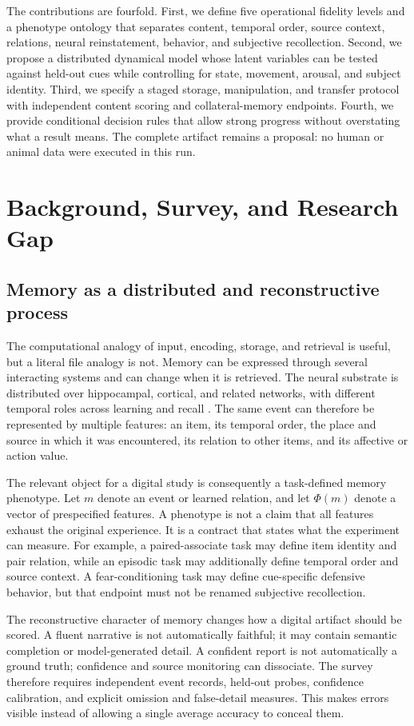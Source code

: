 \documentclass[conference]{IEEEtran}
\begin{document}
The contributions are fourfold. First, we define five operational fidelity levels and a phenotype ontology that separates content, temporal order, source context, relations, neural reinstatement, behavior, and subjective recollection. Second, we propose a distributed dynamical model whose latent variables can be tested against held-out cues while controlling for state, movement, arousal, and subject identity. Third, we specify a staged storage, manipulation, and transfer protocol with independent content scoring and collateral-memory endpoints. Fourth, we provide conditional decision rules that allow strong progress without overstating what a result means. The complete artifact remains a proposal: no human or animal data were executed in this run.

\section{Background, Survey, and Research Gap}
\subsection{Memory as a distributed and reconstructive process}
The computational analogy of input, encoding, storage, and retrieval is useful, but a literal file analogy is not. Memory can be expressed through several interacting systems and can change when it is retrieved. The neural substrate is distributed over hippocampal, cortical, and related networks, with different temporal roles across learning and recall \cite{Squire2011,Kandel2014}. The same event can therefore be represented by multiple features: an item, its temporal order, the place and source in which it was encountered, its relation to other items, and its affective or action value.

The relevant object for a digital study is consequently a task-defined memory phenotype. Let $m$ denote an event or learned relation, and let $\Phi(m)$ denote a vector of prespecified features. A phenotype is not a claim that all features exhaust the original experience. It is a contract that states what the experiment can measure. For example, a paired-associate task may define item identity and pair relation, while an episodic task may additionally define temporal order and source context. A fear-conditioning task may define cue-specific defensive behavior, but that endpoint must not be renamed subjective recollection.

The reconstructive character of memory changes how a digital artifact should be scored. A fluent narrative is not automatically faithful; it may contain semantic completion or model-generated detail. A confident report is not automatically a ground truth; confidence and source monitoring can dissociate. The survey therefore requires independent event records, held-out probes, confidence calibration, and explicit omission and false-detail measures. This makes errors visible instead of allowing a single average accuracy to conceal them.
\end{document}
